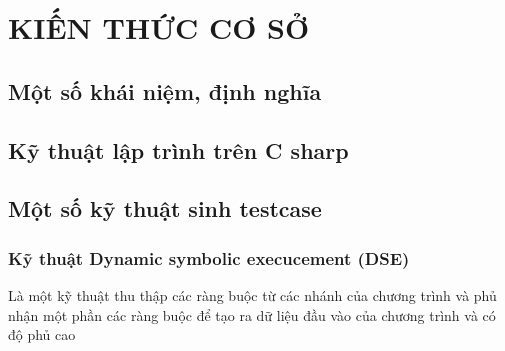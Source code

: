 \newpage
\chapter{KIẾN THỨC CƠ SỞ}

\section{Một số khái niệm, định nghĩa}
\section{Kỹ thuật lập trình trên C sharp}

\section{Một số kỹ thuật sinh testcase}
	\subsection{Kỹ thuật Dynamic symbolic execucement (DSE) }
	Là một kỹ thuật thu thập các ràng buộc từ các nhánh của chương trình và phủ nhận một phần các ràng buộc để tạo ra dữ liệu đầu vào của chương trình và có độ phủ cao

	
